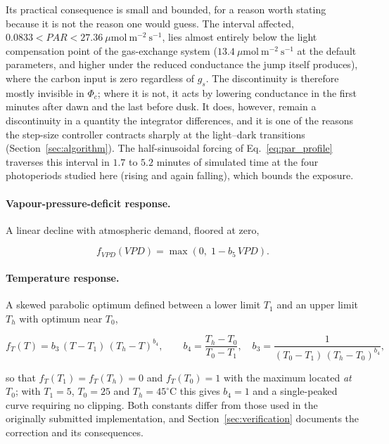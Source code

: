 \documentclass[a4paper,fleqn]{cas-sc}
\begin{document}
Its practical consequence is small and bounded, for a reason worth stating
because it is not the reason one would guess. The interval affected,
$0.0833 < \mathit{PAR} < 27.36\ \mu\mathrm{mol\ m^{-2}\ s^{-1}}$, lies almost
entirely below the light compensation point of the gas-exchange system
($13.4\ \mu\mathrm{mol\ m^{-2}\ s^{-1}}$ at the default parameters, and
higher under the reduced conductance the jump itself produces), where the
carbon input is zero regardless of $g_s$. The discontinuity is therefore
mostly invisible in $\Phi_c$; where it is not, it acts by lowering conductance in
the first minutes after dawn and the last before dusk. It does, however,
remain a discontinuity in a quantity the integrator differences, and it is
one of the reasons the step-size controller contracts sharply at the
light--dark transitions (Section~\ref{sec:algorithm}). The half-sinusoidal
forcing of Eq.~\eqref{eq:par_profile} traverses this interval in $1.7$ to
$5.2$ minutes of simulated time at the four photoperiods studied here (rising
and again falling), which bounds the exposure.

\paragraph{Vapour-pressure-deficit response.}
A linear decline with atmospheric demand, floored at zero,

\begin{equation}
f_{\mathit{VPD}}(\mathit{VPD}) =
\max\!\left(0,\; 1 - b_5\,\mathit{VPD}\right).
\label{eq:jarvis_vpd}
\end{equation}

\paragraph{Temperature response.}
A skewed parabolic optimum \citep{Jarvis1976} defined between a lower limit
$T_1$ and an upper limit $T_h$ with optimum near $T_0$,

\begin{equation}
f_{T}(T) =
b_3\,(T - T_1)\,(T_h - T)^{b_4},
\qquad
b_4 = \frac{T_h - T_0}{T_0 - T_1},
\quad
b_3 = \frac{1}{(T_0 - T_1)\,(T_h - T_0)^{b_4}},
\label{eq:jarvis_T}
\end{equation}

so that $f_T(T_1)=f_T(T_h)=0$ and $f_T(T_0)=1$ with the maximum located
\emph{at} $T_0$; with $T_1=5$, $T_0=25$ and $T_h=45^{\circ}$C this gives
$b_4=1$ and a single-peaked curve requiring no clipping. Both constants
differ from those used in the originally submitted implementation, and
Section~\ref{sec:verification} documents the correction and its consequences.
\end{document}
